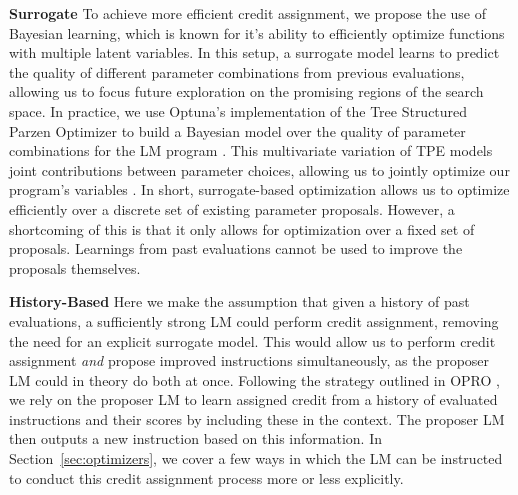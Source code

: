 \textbf{Surrogate}
To achieve more efficient credit assignment, we propose the use of Bayesian learning, which is known for it's ability to efficiently optimize functions with multiple latent variables. In this setup, a surrogate model learns to predict the quality of different parameter combinations from previous evaluations, allowing us to focus future exploration on the promising regions of the search space. In practice, we use Optuna's implementation of the Tree Structured Parzen Optimizer to build a Bayesian model over the quality of parameter combinations for the LM program \citep{akiba2019optuna, bergstra2011algorithms}. This multivariate variation of TPE models joint contributions between parameter choices, allowing us to jointly optimize our program's variables \cite{pmlr-v80-falkner18a}. In short, surrogate-based optimization allows us to optimize efficiently over a discrete set of existing parameter proposals. However, a shortcoming of this is that it only allows for optimization over a fixed set of proposals. Learnings from past evaluations cannot be used to improve the proposals themselves.





\textbf{History-Based} Here we make the assumption that given a history of past evaluations, a sufficiently strong LM could perform credit assignment, removing the need for an explicit surrogate model. This would allow us to perform credit assignment \textit{and} propose improved instructions simultaneously, as the proposer LM could in theory do both at once. Following the strategy outlined in OPRO \citep{yang2023large}, we rely on the proposer LM to learn assigned credit from a history of evaluated instructions and their scores by including these in the context. The proposer LM then outputs a new instruction based on this information. In Section~\ref{sec:optimizers}, we cover a few ways in which the LM can be instructed to conduct this credit assignment process more or less explicitly.

